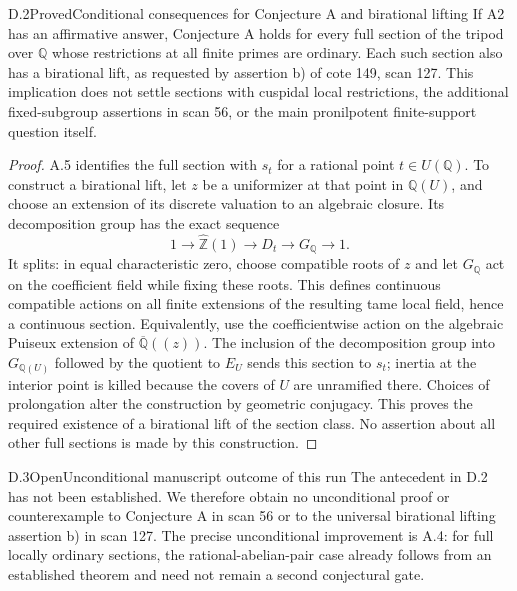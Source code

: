 \begin{result}{D.2}{Proved}{Conditional consequences for Conjecture A and birational lifting}
If A2 has an affirmative answer, Conjecture A holds for every full
section of the tripod over \(\mathbb Q\) whose restrictions at all
finite primes are ordinary. Each such section also has a birational
lift, as requested by assertion b) of cote 149, scan 127. This
implication does not settle sections with cuspidal local restrictions,
the additional fixed-subgroup assertions in scan 56, or the main
pronilpotent finite-support question itself.
\end{result}
\begin{proof}
A.5 identifies the full section with \(s_t\) for a rational point
\(t\in U(\mathbb Q)\). To construct a birational lift, let \(z\)
be a uniformizer at that point in \(\mathbb Q(U)\), and choose an
extension of its discrete valuation to an algebraic closure. Its
decomposition group has the exact sequence
\[
 1\longrightarrow\widehat{\mathbb Z}(1)
 \longrightarrow D_t\longrightarrow G_{\mathbb Q}\longrightarrow1.
\]
It splits: in equal characteristic zero, choose compatible roots of
\(z\) and let \(G_{\mathbb Q}\) act on the coefficient field while
fixing these roots. This defines continuous compatible actions on
all finite extensions of the resulting tame local field, hence a
continuous section. Equivalently, use the coefficientwise action on
the algebraic Puiseux extension of \(\overline{\mathbb Q}((z))\).
The inclusion of the decomposition group into
\(G_{\mathbb Q(U)}\) followed by the quotient to \(E_U\) sends
this section to \(s_t\); inertia at the interior point is killed
because the covers of \(U\) are unramified there.
Choices of prolongation alter the construction by geometric
conjugacy. This proves the required existence of a birational lift
of the section class. No assertion about all other full sections is
made by this construction.
\end{proof}

\begin{result}{D.3}{Open}{Unconditional manuscript outcome of this run}
The antecedent in D.2 has not been established. We therefore obtain no
unconditional proof or counterexample to Conjecture A in scan 56 or to
the universal birational lifting assertion b) in scan 127. The precise
unconditional improvement is A.4: for full locally ordinary sections,
the rational-abelian-pair case already follows from an established
theorem and need not remain a second conjectural gate.
\end{result}
